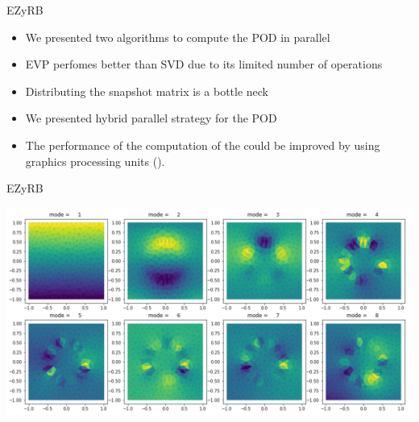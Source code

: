 \begin{frame}{EZyRB}
	\Large{}
	\normalsize

	\begin{itemize}
		\item We presented two algorithms to compute the POD in parallel
		\item EVP perfomes better than SVD due to its limited number of operations
		\item Distributing the snapshot matrix is a bottle neck
		\item We presented hybrid parallel strategy for the POD
	\end{itemize}	

	\vspace{5mm}

	\Large{}
	\normalsize
	
	\begin{itemize}
		\item The performance of the computation of the  could be improved by using graphics processing units ().
		\
	\end{itemize}
\end{frame}

\begin{frame}{EZyRB}
	\Large{}
	\normalsize
	
	
	\includegraphics[width=\textwidth]{../images/PODmodes}
	
\end{frame}



